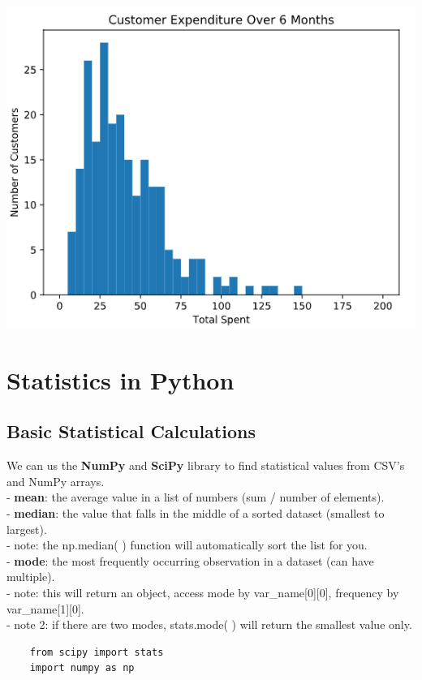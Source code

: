 \documentclass[11pt, a4paper]{article}
\begin{document}
\begin{spacing}{1.1}
	\begin{minipage}[c]{6cm}
		\includegraphics[scale=.39]{figure3}
	\end{minipage} \newpage
	
	\section{Statistics in Python}
	\subsection{Basic Statistical Calculations}
	We can us the \textbf{NumPy} and \textbf{SciPy} library to find statistical values from CSV's and NumPy arrays. \\
	\hspace*{3mm} - \textbf{mean}: the average value in a list of numbers (sum / number of elements). \\
	\hspace*{3mm} - \textbf{median}: the value that falls in the middle of a sorted dataset (smallest to largest). \\
	\hspace*{8mm} - note: the np.median( ) function will automatically sort the list for you. \\
	\hspace*{3mm} - \textbf{mode}: the most frequently occurring observation in a dataset (can have multiple).\\
	\hspace*{8mm} - note: this will return an object, access mode by var\_name[0][0], frequency by var\_name[1][0]. \\
	\hspace*{8mm} - note 2: if there are two modes, stats.mode( ) will return the smallest value only.
	\begin{lstlisting}
	from scipy import stats
	import numpy as np
	

\end{lstlisting}
\end{spacing}
\end{document}
